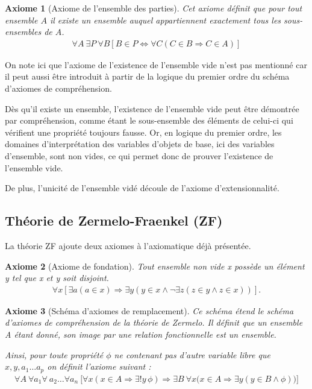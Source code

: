 \documentclass[10pt,a4paper]{article}
\newtheorem{axiom}{Axiome}[section]
\begin{document}
\begin{axiom}[Axiome de l'ensemble des parties] Cet axiome définit que pour tout ensemble $A$ il existe un ensemble auquel appartiennent exactement tous les sous-ensembles de $A$.
\begin{align}
\forall A \ \exists P \ \forall B \left[B \in P \Leftrightarrow \forall C \left( C \in B \Rightarrow C \in A \right) \right] 
\end{align}
\end{axiom}

On note ici que l'axiome de l'existence de l'ensemble vide n'est pas mentionné car il peut aussi être introduit à partir de la logique du premier ordre du schéma d'axiomes de compréhension.

Dès qu'il existe un ensemble, l'existence de l'ensemble vide peut être démontrée par compréhension, comme étant le sous-ensemble des éléments de celui-ci qui vérifient une propriété toujours fausse.
Or, en logique du premier ordre, les domaines d'interprétation des variables d'objets de base, ici des variables d'ensemble, sont non vides, ce qui permet donc de prouver l'existence de l'ensemble vide.

De plus, l'unicité de l'ensemble vidé découle de l'axiome d'extensionnalité.

\subsection{Théorie de Zermelo-Fraenkel (ZF)}

La théorie ZF ajoute deux axiomes à l'axiomatique déjà présentée.

\begin{axiom}[Axiome de fondation] Tout ensemble non vide x possède un élément y tel que x et y soit disjoint.
\begin{align}
\forall x [ \exists a ( a \in x) \Rightarrow \exists y ( y \in x \land \lnot \exists z (z \in y \land z \in x))]. 
\end{align}
\end{axiom}

\begin{axiom}[Schéma d'axiomes de remplacement] Ce schéma étend le schéma d'axiomes de compréhension de la théorie de Zermelo. Il définit que un ensemble A étant donné, son image par une relation fonctionnelle est un ensemble.

Ainsi, pour toute propriété $\phi$ ne contenant pas d'autre variable libre que $x, y, a_1 \ldots a_p$ on définit l'axiome suivant :
\begin{align}
\forall A \ \forall a_1 \forall \ a_2 \ldots \forall a_n \ 
\bigl[ \forall x ( x\in A \Rightarrow \exists! y\,\phi ) \Rightarrow \exists B \ \forall x \bigl(x\in A \Rightarrow \exists y (y\in B \land \phi) \bigr) \bigr]
\end{align}
\end{axiom}
\end{document}
